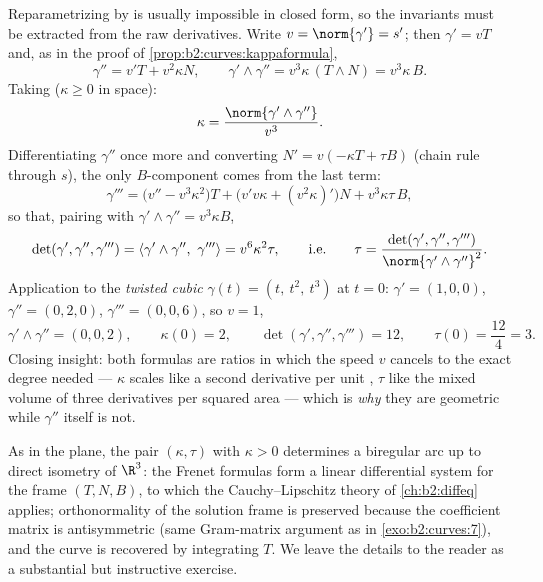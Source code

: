\begin{example}\label{ex:b2:curves:twistedcubic}
Reparametrizing by  is usually impossible in closed
form, so the invariants must be extracted from the raw
derivatives. Write $v = \norm{\gamma'} = s'$; then $\gamma' =
vT$ and, as in the proof of
\cref{prop:b2:curves:kappaformula},
\[
\gamma'' = v'T + v^2\kappa N,
\qquad
\gamma' \wedge \gamma'' = v^3\kappa\,(T \wedge N) =
v^3\kappa\,B .
\]
Taking  ($\kappa \geq 0$ in space):
\[
\kappa = \frac{\norm{\gamma' \wedge \gamma''}}{v^3} .
\]
Differentiating $\gamma''$ once more and converting $N' =
v(-\kappa T + \tau B)$ (chain rule through $s$), the only
$B$-component comes from the last term:
\[
\gamma''' = \bigl(v'' - v^3\kappa^2\bigr)T +
\bigl(v'v\kappa + (v^2\kappa)'\bigr)N + v^3\kappa\tau\,B,
\]
so that, pairing with $\gamma' \wedge \gamma'' = v^3\kappa B$,
\[
\det(\gamma', \gamma'', \gamma''') = \langle\gamma' \wedge
\gamma'',\ \gamma'''\rangle = v^6\kappa^2\tau,
\qquad\text{i.e.}\qquad
\tau = \frac{\det(\gamma', \gamma'',
\gamma''')}{\norm{\gamma' \wedge \gamma''}^2} .
\]
Application to the \emph{twisted cubic} $\gamma(t) = (t,\
t^2,\ t^3)$ at $t = 0$: $\gamma' = (1, 0, 0)$, $\gamma'' =
(0, 2, 0)$, $\gamma''' = (0, 0, 6)$, so $v = 1$,
\[
\gamma' \wedge \gamma'' = (0, 0, 2), \qquad \kappa(0) = 2,
\qquad
\det(\gamma', \gamma'', \gamma''') = 12, \qquad \tau(0) =
\frac{12}{4} = 3 .
\]
Closing insight: both formulas are ratios in which the speed
$v$ cancels to the exact degree needed --- $\kappa$ scales
like a second derivative per unit , $\tau$ like the
mixed volume of three derivatives per squared area --- which
is \emph{why} they are geometric while $\gamma''$ itself is
not.
\end{example}

\begin{remark}
As in the plane, the pair $(\kappa, \tau)$ with $\kappa > 0$
determines a biregular arc up to direct isometry of $\R^3$: the
Frenet formulas form a linear differential system for the frame
$(T, N, B)$, to which the Cauchy--Lipschitz theory of
\cref{ch:b2:diffeq} applies; orthonormality of the solution frame
is preserved because the coefficient matrix is antisymmetric (same
Gram-matrix argument as in \cref{exo:b2:curves:7}), and the curve
is recovered by integrating $T$. We leave the details to the
reader as a substantial but instructive exercise.
\end{remark}

